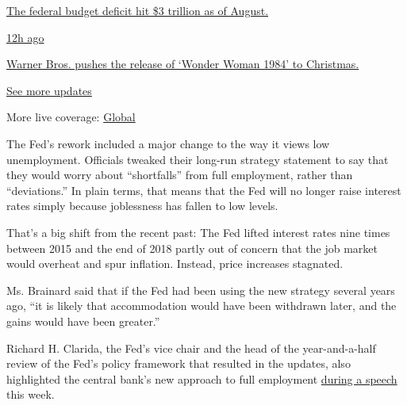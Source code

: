 \href{https://www.nytimes3xbfgragh.onion/live/2020/09/11/business/stock-market-today-coronavirus?action=click\&pgtype=Article\&state=default\&region=MAIN_CONTENT_1\&context=storylines_live_updates\#the-federal-budget-deficit-hit-3-trillion-as-of-august}{The
federal budget deficit hit \$3 trillion as of August.}

\href{https://www.nytimes3xbfgragh.onion/live/2020/09/11/business/stock-market-today-coronavirus?action=click\&pgtype=Article\&state=default\&region=MAIN_CONTENT_1\&context=storylines_live_updates\#warner-bros-pushes-the-release-of-wonder-woman-1984-to-christmas}{12h
ago}

\href{https://www.nytimes3xbfgragh.onion/live/2020/09/11/business/stock-market-today-coronavirus?action=click\&pgtype=Article\&state=default\&region=MAIN_CONTENT_1\&context=storylines_live_updates\#warner-bros-pushes-the-release-of-wonder-woman-1984-to-christmas}{Warner
Bros. pushes the release of `Wonder Woman 1984' to Christmas.}

\href{https://www.nytimes3xbfgragh.onion/live/2020/09/11/business/stock-market-today-coronavirus?action=click\&pgtype=Article\&state=default\&region=MAIN_CONTENT_1\&context=storylines_live_updates}{See
more updates}

More live coverage:
\href{https://www.nytimes3xbfgragh.onion/2020/09/11/world/covid-19-coronavirus.html?action=click\&pgtype=Article\&state=default\&region=MAIN_CONTENT_1\&context=storylines_live_updates}{Global}

The Fed's rework included a major change to the way it views low
unemployment. Officials tweaked their long-run strategy statement to say
that they would worry about ``shortfalls'' from full employment, rather
than ``deviations.'' In plain terms, that means that the Fed will no
longer raise interest rates simply because joblessness has fallen to low
levels.

That's a big shift from the recent past: The Fed lifted interest rates
nine times between 2015 and the end of 2018 partly out of concern that
the job market would overheat and spur inflation. Instead, price
increases stagnated.

Ms. Brainard said that if the Fed had been using the new strategy
several years ago, ``it is likely that accommodation would have been
withdrawn later, and the gains would have been greater.''

Richard H. Clarida, the Fed's vice chair and the head of the
year-and-a-half review of the Fed's policy framework that resulted in
the updates, also highlighted the central bank's new approach to full
employment
\href{https://www.nytimes3xbfgragh.onion/live/2020/08/31/business/stock-market-today-coronavirus\#a-top-fed-official-says-low-unemployment-alone-wont-trigger-higher-rates}{during
a speech} this week.

